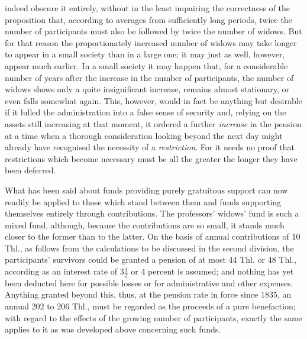 indeed obscure it entirely, without in the least impairing the correctness of the proposition that, according to averages from sufficiently long periods, twice the number of participants must also be followed by twice the number of widows. But for that reason the proportionately increased number of widows may take longer to appear in a small society than in a large one; it may just as well, however, appear much earlier. In a small society it may happen that, for a considerable number of years after the increase in the number of participants, the number of widows shows only a quite insignificant increase, remains almost stationary, or even falls somewhat again. This, however, would in fact be anything but desirable if it lulled the administration into a false sense of security and, relying on the assets still increasing at that moment, it ordered a further \textit{increase} in the pension at a time when a thorough consideration looking beyond the next day might already have recognised the necessity of a \textit{restriction}. For it needs no proof that restrictions which become necessary must be all the greater the longer they have been deferred.

What has been said about funds providing purely gratuitous support can now readily be applied to those which stand between them and funds supporting themselves entirely through contributions. The professors' widows' fund is such a mixed fund, although, because the contributions are so small, it stands much closer to the former than to the latter. On the basis of annual contributions of 10 Thl., as follows from the calculations to be discussed in the second division, the participants' survivors could be granted a pension of at most 44 Thl. or 48 Thl., according as an interest rate of \(3\tfrac12\) or 4 percent is assumed; and nothing has yet been deducted here for possible losses or for administrative and other expenses. Anything granted beyond this, thus, at the pension rate in force since 1835, an annual 202 to 206 Thl., must be regarded as the proceeds of a pure benefaction; with regard to the effects of the growing number of participants, exactly the same applies to it as was developed above concerning such funds.

